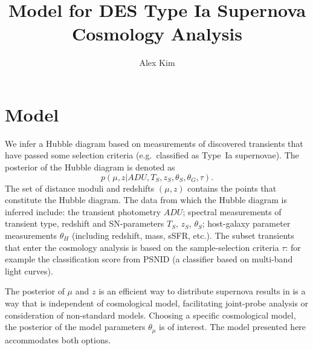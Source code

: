 \documentclass[preprint]{aastex}
\begin{document}
\title{Model for DES Type Ia Supernova Cosmology Analysis}
\author{Alex Kim}

\section{Model}
We infer a Hubble diagram based on measurements of discovered transients
that have passed some selection criteria (e.g.\ classified as Type~Ia supernovae).  The posterior
of the Hubble diagram is denoted as
\begin{equation}
p({\mu},{z} |  {{ADU}}, {{T}}_S,{{z}}_S,
{{\theta}}_S, \theta_G, \tau).
\label{hd:eqn}
\end{equation}
The set of distance moduli
and redshifts $(\mu, z)$ contains the points that constitute the Hubble diagram.  The
data
from which the Hubble diagram is inferred include:
the transient photometry ${ADU}$; spectral measurements of
transient
type, redshift and SN-parameters ${T}_S$, ${z}_S$, ${\theta}_S$;
host-galaxy parameter measurements $\theta_H$ (including redshift,
mass, sSFR, etc.).  
The subset transients that enter the cosmology
analysis is based on the sample-selection criteria $\tau$: for example
the classification score from PSNID (a classifier based on multi-band
light curves).

The posterior of $\mu$ and $z$ is an efficient way
to distribute supernova results in is a way that is independent of cosmological model,
facilitating joint-probe analysis or consideration of non-standard models.  Choosing
a specific cosmological model, the posterior of the model parameters $\theta_\mu$
is of interest.  The model presented here accommodates both options.
\end{document}
